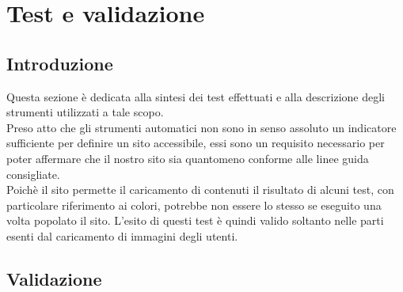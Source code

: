 \documentclass[a4paper,12pt]{article}
\begin{document}
\section{Test e validazione}
\subsection{Introduzione}
Questa sezione è dedicata alla sintesi dei test effettuati e alla descrizione degli strumenti utilizzati a tale scopo.\\
Preso atto che gli strumenti automatici non sono in senso assoluto un indicatore sufficiente per definire un sito accessibile, essi sono un requisito necessario per poter affermare che il nostro sito sia quantomeno conforme alle linee guida consigliate.\\
Poichè il sito permette il caricamento di contenuti il risultato di alcuni test, con particolare riferimento ai colori, potrebbe non essere lo stesso se eseguito una volta popolato il sito. L'esito di questi test è quindi valido soltanto nelle parti esenti dal caricamento di immagini degli utenti.
\subsection{Validazione}
\end{document}
